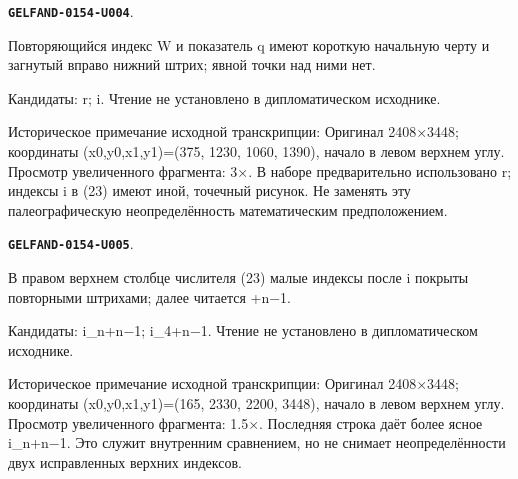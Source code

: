 \documentclass[11pt]{article}
\theoremstyle{definition}
\theoremstyle{remark}
\begin{document}
\par\noindent\leavevmode{}\label{GELFAND-0154-U004}\label{GELFAND-P001415:w-index:note}\textbf{\texttt{GELFAND-0154-U004}}.\nopagebreak[4]\par
Повторяющийся индекс W и показатель q имеют короткую начальную черту и загнутый вправо нижний штрих; явной точки над ними нет.\par
Кандидаты: r; i. Чтение не установлено в дипломатическом исходнике.\par
Историческое примечание исходной транскрипции: Оригинал 2408×3448; координаты (x0,y0,x1,y1)=(375, 1230, 1060, 1390), начало в левом верхнем углу. Просмотр увеличенного фрагмента: 3×. В наборе предварительно использовано r; индексы i в (23) имеют иной, точечный рисунок. Не заменять эту палеографическую неопределённость математическим предположением.\par\medskip
\par\noindent\leavevmode{}\label{GELFAND-0154-U005}\label{GELFAND-P001415:eq23-overwritten-exponents:note}\textbf{\texttt{GELFAND-0154-U005}}.\nopagebreak[4]\par
В правом верхнем столбце числителя (23) малые индексы после i покрыты повторными штрихами; далее читается +n−1.\par
Кандидаты: i\_n+n−1; i\_4+n−1. Чтение не установлено в дипломатическом исходнике.\par
Историческое примечание исходной транскрипции: Оригинал 2408×3448; координаты (x0,y0,x1,y1)=(165, 2330, 2200, 3448), начало в левом верхнем углу. Просмотр увеличенного фрагмента: 1.5×. Последняя строка даёт более ясное i\_n+n−1. Это служит внутренним сравнением, но не снимает неопределённости двух исправленных верхних индексов.\par\medskip
\end{document}
